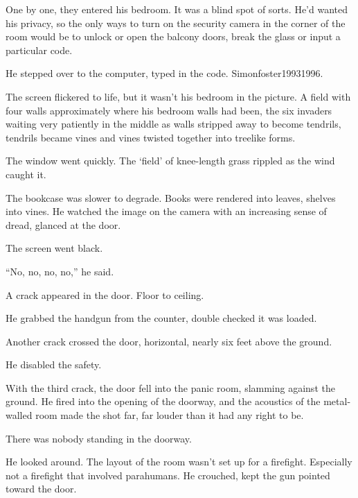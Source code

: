 One by one, they entered his bedroom.  It was a blind spot of sorts.  He'd wanted his privacy, so the only ways to turn on the security camera in the corner of the room would be to unlock or open the balcony doors, break the glass or input a particular code.



He stepped over to the computer, typed in the code.  Simonfoster19931996.



The screen flickered to life, but it wasn't his bedroom in the picture.  A field with four walls approximately where his bedroom walls had been, the six invaders waiting very patiently in the middle as walls stripped away to become tendrils, tendrils became vines and vines twisted together into treelike forms.



The window went quickly.  The `field' of knee-length grass rippled as the wind caught it.



The bookcase was slower to degrade.  Books were rendered into leaves, shelves into vines.  He watched the image on the camera with an increasing sense of dread, glanced at the door.



The screen went black.



``No, no, no, no,'' he said.



A crack appeared in the door.  Floor to ceiling.



He grabbed the handgun from the counter, double checked it was loaded.



Another crack crossed the door, horizontal, nearly six feet above the ground.



He disabled the safety.



With the third crack, the door fell into the panic room, slamming against the ground.  He fired into the opening of the doorway, and the acoustics of the metal-walled room made the shot far, far louder than it had any right to be.



There was nobody standing in the doorway.



He looked around.  The layout of the room wasn't set up for a firefight.  Especially not a firefight that involved parahumans.  He crouched, kept the gun pointed toward the door.



